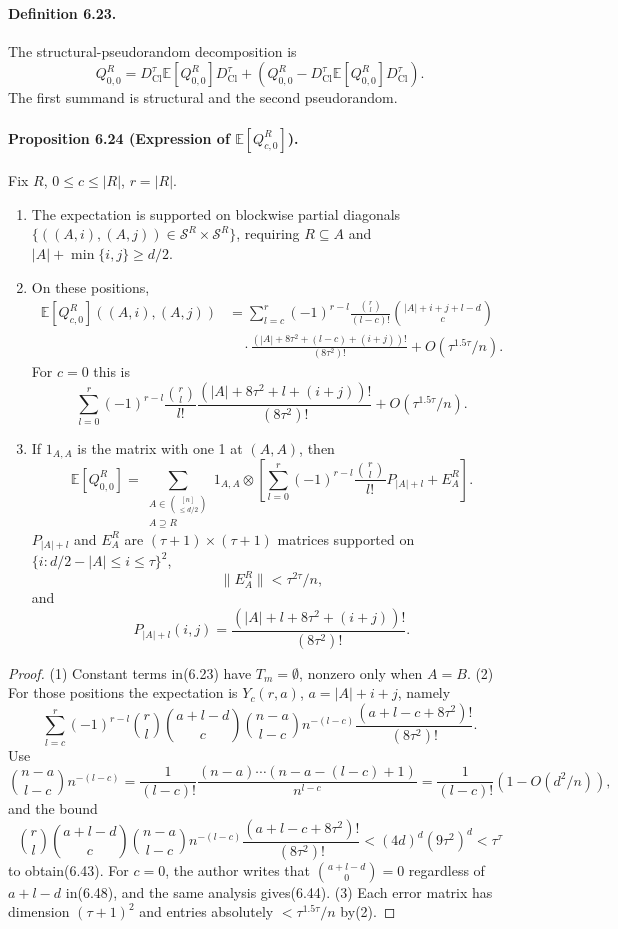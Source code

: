 \documentclass[10pt,a4paper]{article}
\begin{document}
\paragraph{Definition 6.23.} The structural-pseudorandom decomposition is
\[Q_{0,0}^R=D_{\mathrm{Cl}}^\tau\mathbb E[Q_{0,0}^R]D_{\mathrm{Cl}}^\tau+\left(Q_{0,0}^R-D_{\mathrm{Cl}}^\tau\mathbb E[Q_{0,0}^R]D_{\mathrm{Cl}}^\tau\right).\tag{6.42}\]
The first summand is structural and the second pseudorandom.
\paragraph{Proposition 6.24 (Expression of $\mathbb E[Q_{c,0}^R]$).} Fix $R$, $0\le c\le|R|$, $r=|R|$.
\begin{enumerate}\item The expectation is supported on blockwise partial diagonals $\{((A,i),(A,j))\in\mathcal S^R\times\mathcal S^R\}$, requiring $R\subseteq A$ and $|A|+\min\{i,j\}\ge d/2$.
\item On these positions,
\begin{align*}\mathbb E[Q_{c,0}^R]((A,i),(A,j))&=\sum_{l=c}^r(-1)^{r-l}\frac{\binom rl}{(l-c)!}\binom{|A|+i+j+l-d}c\\&\quad\cdot\frac{(|A|+8\tau^2+(l-c)+(i+j))!}{(8\tau^2)!}+O(\tau^{1.5\tau}/n).\tag{6.43}\end{align*}
For $c=0$ this is
\[\sum_{l=0}^r(-1)^{r-l}\frac{\binom rl}{l!}\frac{(|A|+8\tau^2+l+(i+j))!}{(8\tau^2)!}+O(\tau^{1.5\tau}/n).\tag{6.44}\]
\item If $1_{A,A}$ is the matrix with one 1 at $(A,A)$, then
\[\mathbb E[Q_{0,0}^R]=\sum_{\substack{A\in\binom{[n]}{\le d/2}\\A\supseteq R}}1_{A,A}\otimes\left[\sum_{l=0}^r(-1)^{r-l}\frac{\binom rl}{l!}P_{|A|+l}+E_A^R\right].\tag{6.45}\]
$P_{|A|+l}$ and $E_A^R$ are $(\tau+1)\times(\tau+1)$ matrices supported on $\{i:d/2-|A|\le i\le\tau\}^2$,
\[\|E_A^R\|<\tau^{2\tau}/n,\tag{6.46}\]
and
\[P_{|A|+l}(i,j)=\frac{(|A|+l+8\tau^2+(i+j))!}{(8\tau^2)!}.\tag{6.47}\]
\end{enumerate}
\begin{proof}(1) Constant terms in(6.23) have $T_m=\emptyset$, nonzero only when $A=B$. (2) For those positions the expectation is $Y_c(r,a)$, $a=|A|+i+j$, namely
\[\sum_{l=c}^r(-1)^{r-l}\binom rl\binom{a+l-d}c\binom{n-a}{l-c}n^{-(l-c)}\frac{(a+l-c+8\tau^2)!}{(8\tau^2)!}.\tag{6.48}\]
Use
\[\binom{n-a}{l-c}n^{-(l-c)}=\frac1{(l-c)!}\frac{(n-a)\cdots(n-a-(l-c)+1)}{n^{l-c}}=\frac1{(l-c)!}(1-O(d^2/n)),\]
and the bound
\[\binom rl\binom{a+l-d}c\binom{n-a}{l-c}n^{-(l-c)}\frac{(a+l-c+8\tau^2)!}{(8\tau^2)!}<(4d)^d(9\tau^2)^d<\tau^\tau\]
to obtain(6.43). For $c=0$, the author writes that $\binom{a+l-d}0=0$ regardless of $a+l-d$ in(6.48), and the same analysis gives(6.44). (3) Each error matrix has dimension $(\tau+1)^2$ and entries absolutely $<\tau^{1.5\tau}/n$ by(2).\end{proof}
\end{document}
